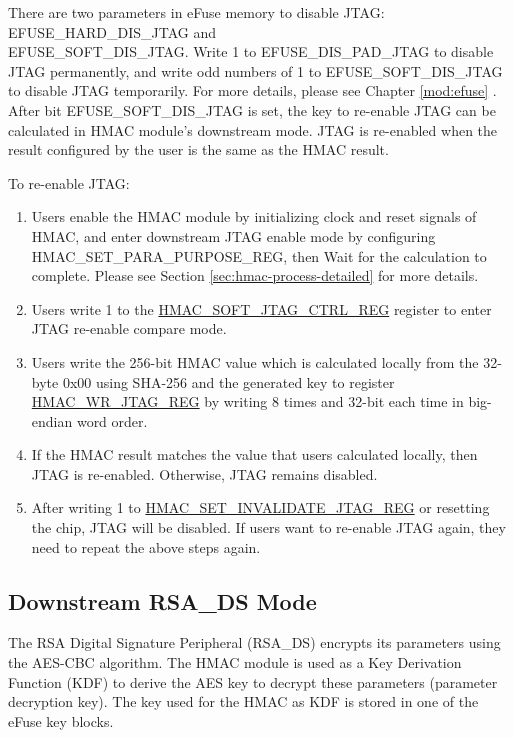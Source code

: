 \documentclass[main\_\_EN.tex]{subfiles}
\begin{document}
There are two parameters in eFuse memory to disable JTAG: EFUSE\_HARD\_DIS\_JTAG and \\EFUSE\_SOFT\_DIS\_JTAG. Write 1 to EFUSE\_DIS\_PAD\_JTAG to disable JTAG permanently, and write odd numbers of 1 to EFUSE\_SOFT\_DIS\_JTAG to disable JTAG temporarily. For more details, please see Chapter \ref{mod:efuse} \textit{}. After bit EFUSE\_SOFT\_DIS\_JTAG is set, the key to re-enable JTAG can be calculated in HMAC module's downstream mode. JTAG is re-enabled when the result configured by the user is the same as the HMAC result.

To re-enable JTAG:

\begin{enumerate}
\item Users enable the HMAC module by initializing clock and reset signals of HMAC, and enter downstream JTAG enable mode by configuring HMAC\_SET\_PARA\_PURPOSE\_REG, then Wait for the calculation to complete. Please see Section \ref{sec:hmac-process-detailed} for more details.
\item Users write 1 to the \hyperref[regdesc:HMACSOFTJTAGCTRLREG]{HMAC\_SOFT\_JTAG\_CTRL\_REG} register to enter JTAG re-enable compare mode.
\item Users write the 256-bit HMAC value which is calculated locally from the 32-byte 0x00 using SHA-256 and the generated key to register \hyperref[regdesc:HMACWRJTAGREG]{HMAC\_WR\_JTAG\_REG} by writing 8 times and 32-bit each time in big-endian word order.
\item If the HMAC result matches the value that users calculated locally, then JTAG is re-enabled. Otherwise, JTAG remains disabled.
\item After writing 1 to \hyperref[regdesc:HMACSETINVALIDATEJTAGREG]{HMAC\_SET\_INVALIDATE\_JTAG\_REG} or resetting the chip, JTAG will be disabled. If users want to re-enable JTAG again, they need to repeat the above steps again.
\end{enumerate}

\subsection{Downstream RSA\_DS Mode}

The RSA Digital Signature Peripheral (RSA\_DS) encrypts its parameters using the AES-CBC algorithm. The HMAC module is used as a Key Derivation Function (KDF) to derive the AES key to decrypt these parameters (parameter decryption key). The key used for the HMAC as KDF is stored in one of the eFuse key blocks.
\end{document}
